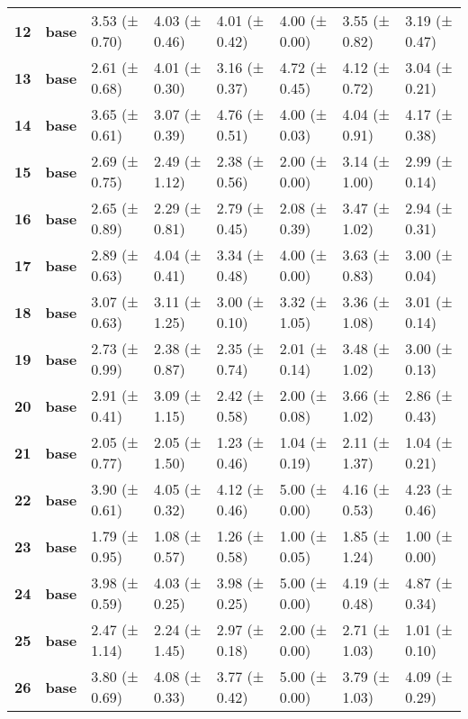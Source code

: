 \begin{longtable}{llllllll}
\cline{1-8}
\textbf{12} & \textbf{base} & 3.53 (± 0.70) & 4.03 (± 0.46) & 4.01 (± 0.42) & 4.00 (± 0.00) & 3.55 (± 0.82) & 3.19 (± 0.47) \\
\cline{1-8}
\textbf{13} & \textbf{base} & 2.61 (± 0.68) & 4.01 (± 0.30) & 3.16 (± 0.37) & 4.72 (± 0.45) & 4.12 (± 0.72) & 3.04 (± 0.21) \\
\cline{1-8}
\textbf{14} & \textbf{base} & 3.65 (± 0.61) & 3.07 (± 0.39) & 4.76 (± 0.51) & 4.00 (± 0.03) & 4.04 (± 0.91) & 4.17 (± 0.38) \\
\cline{1-8}
\textbf{15} & \textbf{base} & 2.69 (± 0.75) & 2.49 (± 1.12) & 2.38 (± 0.56) & 2.00 (± 0.00) & 3.14 (± 1.00) & 2.99 (± 0.14) \\
\cline{1-8}
\textbf{16} & \textbf{base} & 2.65 (± 0.89) & 2.29 (± 0.81) & 2.79 (± 0.45) & 2.08 (± 0.39) & 3.47 (± 1.02) & 2.94 (± 0.31) \\
\cline{1-8}
\textbf{17} & \textbf{base} & 2.89 (± 0.63) & 4.04 (± 0.41) & 3.34 (± 0.48) & 4.00 (± 0.00) & 3.63 (± 0.83) & 3.00 (± 0.04) \\
\cline{1-8}
\textbf{18} & \textbf{base} & 3.07 (± 0.63) & 3.11 (± 1.25) & 3.00 (± 0.10) & 3.32 (± 1.05) & 3.36 (± 1.08) & 3.01 (± 0.14) \\
\cline{1-8}
\textbf{19} & \textbf{base} & 2.73 (± 0.99) & 2.38 (± 0.87) & 2.35 (± 0.74) & 2.01 (± 0.14) & 3.48 (± 1.02) & 3.00 (± 0.13) \\
\cline{1-8}
\textbf{20} & \textbf{base} & 2.91 (± 0.41) & 3.09 (± 1.15) & 2.42 (± 0.58) & 2.00 (± 0.08) & 3.66 (± 1.02) & 2.86 (± 0.43) \\
\cline{1-8}
\textbf{21} & \textbf{base} & 2.05 (± 0.77) & 2.05 (± 1.50) & 1.23 (± 0.46) & 1.04 (± 0.19) & 2.11 (± 1.37) & 1.04 (± 0.21) \\
\cline{1-8}
\textbf{22} & \textbf{base} & 3.90 (± 0.61) & 4.05 (± 0.32) & 4.12 (± 0.46) & 5.00 (± 0.00) & 4.16 (± 0.53) & 4.23 (± 0.46) \\
\cline{1-8}
\textbf{23} & \textbf{base} & 1.79 (± 0.95) & 1.08 (± 0.57) & 1.26 (± 0.58) & 1.00 (± 0.05) & 1.85 (± 1.24) & 1.00 (± 0.00) \\
\cline{1-8}
\textbf{24} & \textbf{base} & 3.98 (± 0.59) & 4.03 (± 0.25) & 3.98 (± 0.25) & 5.00 (± 0.00) & 4.19 (± 0.48) & 4.87 (± 0.34) \\
\cline{1-8}
\textbf{25} & \textbf{base} & 2.47 (± 1.14) & 2.24 (± 1.45) & 2.97 (± 0.18) & 2.00 (± 0.00) & 2.71 (± 1.03) & 1.01 (± 0.10) \\
\cline{1-8}
\textbf{26} & \textbf{base} & 3.80 (± 0.69) & 4.08 (± 0.33) & 3.77 (± 0.42) & 5.00 (± 0.00) & 3.79 (± 1.03) & 4.09 (± 0.29) \\

\end{longtable}
